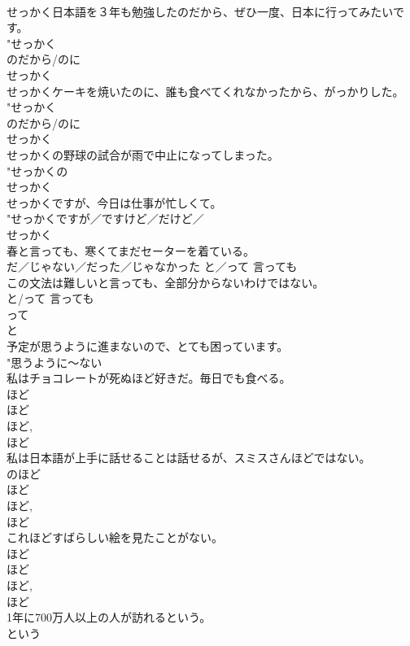 \documentclass[8pt]{extreport}
\begin{document}
\begin{CJK}{UTF8}{min}
\\	せっかく日本語を３年も勉強したのだから、ぜひ一度、日本に行ってみたいです。	
\\	"せっかく 
\\	{のだから/のに} 
\\	せっかく 
\\	せっかくケーキを焼いたのに、誰も食べてくれなかったから、がっかりした。	
\\	"せっかく 
\\	{のだから/のに} 
\\	せっかく 
\\	せっかくの野球の試合が雨で中止になってしまった。	
\\	"せっかくの
\\	せっかく 
\\	せっかくですが、今日は仕事が忙しくて。	
\\	"せっかく{ですが／ですけど／だけど／
\\	せっかく 
\\	春と言っても、寒くてまだセーターを着ている。	
\\	{だ／じゃない／だった／じゃなかった} {と／って} 言っても 
\\	この文法は難しいと言っても、全部分からないわけではない。	
\\	{と/って} 言っても 
\\	って 
\\	と 
\\	予定が思うように進まないので、とても困っています。	
\\	"思うように〜ない 
\\	私はチョコレートが死ぬほど好きだ。毎日でも食べる。	
\\	ほど 
\\	ほど 
\\	ほど, 
\\	ほど 
\\	私は日本語が上手に話せることは話せるが、スミスさんほどではない。	
\\	のほど 
\\	ほど 
\\	ほど, 
\\	ほど 
\\	これほどすばらしい絵を見たことがない。	
\\	ほど 
\\	ほど 
\\	ほど, 
\\	ほど 
\\	1年に700万人以上の人が訪れるという。	
\\	という 
}
\end{CJK}
\end{document}
